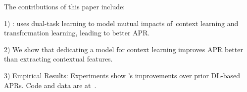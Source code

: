 The contributions of this paper include:





1) {\tool}: uses dual-task learning to model mutual impacts of~context
learning and transformation learning, leading to better APR.



2) We show that dedicating a model for context learning improves APR
better than extracting contextual features.







3) Empirical Results: 
Experiments show {\tool}'s improvements over prior
DL-based APRs. Code and data are at~\cite{CDFix2022}.

